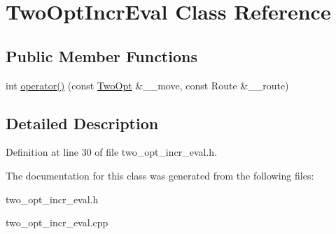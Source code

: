 \hypertarget{classTwoOptIncrEval}{
\section{Two\-Opt\-Incr\-Eval Class Reference}
\label{classTwoOptIncrEval}
}
\subsection*{Public Member Functions}
\begin{CompactItemize}
\item 
\hypertarget{classTwoOptIncrEval_48500077e651c4c6152daef8a396be39}{
int \hyperlink{classTwoOptIncrEval_48500077e651c4c6152daef8a396be39}{operator()} (const \hyperlink{classTwoOpt}{Two\-Opt} \&\_\-\_\-move, const Route \&\_\-\_\-route)}
\label{classTwoOptIncrEval_48500077e651c4c6152daef8a396be39}

\end{CompactItemize}


\subsection{Detailed Description}




Definition at line 30 of file two\_\-opt\_\-incr\_\-eval.h.

The documentation for this class was generated from the following files:\begin{CompactItemize}
\item 
two\_\-opt\_\-incr\_\-eval.h\item 
two\_\-opt\_\-incr\_\-eval.cpp\end{CompactItemize}
